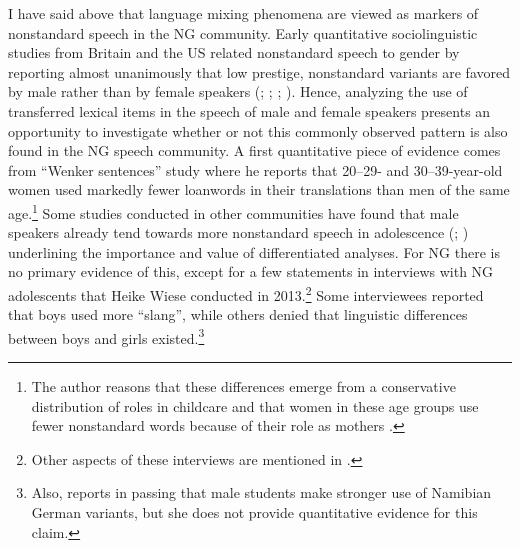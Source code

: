 \documentclass[output=paper]{langsci/langscibook}
\begin{document}
I have said above that language mixing phenomena are viewed as markers of nonstandard speech in the NG community. Early quantitative sociolinguistic studies from Britain and the US related nonstandard speech to gender by reporting almost unanimously that low prestige, nonstandard variants are favored by male rather than by female speakers (\citealt{wolfram_sociolinguistic_1969}; \citealt{trudgill_sex_1972}; \citealt{macaulay_language_1977}; \citealt{labov_social_2006}). Hence, analyzing the use of transferred lexical items in the speech of male and female speakers presents an opportunity to investigate whether or not this commonly observed pattern is also found in the NG speech community. A first quantitative piece of evidence comes from  “Wenker sentences” study where he reports that 20--29- and 30--39-year-old women used markedly fewer loanwords in their translations than men of the same age.\footnote{The author reasons that these differences emerge from a conservative distribution of roles in childcare and that women in these age groups use fewer nonstandard words because of their role as mothers \citep{zimmer_linguisticvar_toappear}.} Some studies conducted in other communities have found that male speakers already tend towards more nonstandard speech in adolescence (\citealt[387]{eckert_language_2003}; \citealt{eisikovitz_girl_2011}) underlining the importance and value of differentiated analyses. For NG there is no primary evidence of this, except for a few statements in interviews with NG adolescents that Heike Wiese conducted in 2013.\footnote{Other aspects of these interviews are mentioned in \citet{wiese_german_2017}.} Some interviewees reported that boys used more “slang”, while others denied that linguistic differences between boys and girls existed.\footnote{Also, \citet[359]{deumert_namibian_2009} reports in passing that male students make stronger use of Namibian German variants, but she does not provide quantitative evidence for this claim.}
\end{document}
